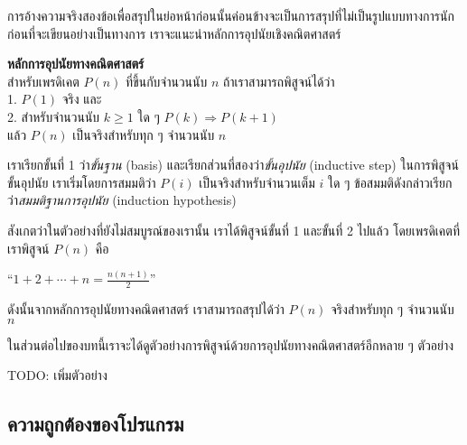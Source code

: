 การ{\wbr}อ้าง{\wbr}ความจริง{\wbr}สอง{\wbr}ข้อ{\wbr}เพื่อ{\wbr}สรุป{\wbr}ใน{\wbr}ย่อหน้า{\wbr}ก่อน{\wbr}นั้น{\wbr}ค่อนข้าง{\wbr}จะ{\wbr}เป็น{\wbr}การ{\wbr}สรุป{\wbr}ที่{\wbr}ไม่{\wbr}เป็น{\wbr}รูปแบบ{\wbr}ทางการ{\wbr}นัก ก่อน{\wbr}ที่{\wbr}จะ{\wbr}เขียน{\wbr}อย่าง{\wbr}เป็นทางการ เรา{\wbr}จะ{\wbr}แนะนำ{\wbr}หลักการ{\wbr}อุปนัย{\wbr}เชิง{\wbr}คณิตศาสตร์{\wbr}

\framed\noindent
{\bf หลักการ{\wbr}อุปนัย{\wbr}ทาง{\wbr}คณิตศาสตร์}\\
สำหรับ{\wbr}เพรดิเคต $P(n)$ ที่{\wbr}ขึ้น{\wbr}กับ{\wbr}จำนวนนับ $n$ ถ้า{\wbr}เรา{\wbr}สามารถ{\wbr}พิสูจน์{\wbr}ได้{\wbr}ว่า\\
1. $P(1)$ จริง และ\\
2. สำหรับ{\wbr}จำนวนนับ $k\geq 1$ ใด ๆ $P(k)\Rightarrow P(k+1)$\\
แล้ว $P(n)$ เป็นจริง{\wbr}สำหรับ{\wbr}ทุก ๆ จำนวนนับ $n$
\endframed

เรา{\wbr}เรียก{\wbr}ขั้น{\wbr}ที่ 1 ว่า{\em ขั้น{\wbr}ฐาน} (basis) และ{\wbr}เรียก{\wbr}ส่วน{\wbr}ที่{\wbr}สอง{\wbr}ว่า{\em ขั้น{\wbr}อุปนัย}
(inductive step) ใน{\wbr}การ{\wbr}พิสูจน์{\wbr}ขั้น{\wbr}อุปนัย เรา{\wbr}เริ่ม{\wbr}โดย{\wbr}การ{\wbr}สมมติ{\wbr}ว่า $ P(i) $
เป็นจริง{\wbr}สำหรับ{\wbr}จำนวนเต็ม $i$ ใด ๆ ข้อสมมติ{\wbr}ดังกล่าว{\wbr}เรียก{\wbr}ว่า{\em สมมติฐาน{\wbr}การ{\wbr}อุปนัย}
(induction hypothesis)

สังเกต{\wbr}ว่า{\wbr}ใน{\wbr}ตัวอย่าง{\wbr}ที่{\wbr}ยัง{\wbr}ไม่{\wbr}สมบูรณ์{\wbr}ของ{\wbr}เรา{\wbr}นั้น เรา{\wbr}ได้{\wbr}พิสูจน์{\wbr}ขั้น{\wbr}ที่ 1 และ{\wbr}ขั้น{\wbr}ที่ 2 ไป{\wbr}แล้ว{\wbr}
โดย{\wbr}เพรดิเคต{\wbr}ที่{\wbr}เรา{\wbr}พิสูจน์ $ P(n) $ คือ{\wbr}

\begin{center}
``$ 1+2+\cdots+n = \frac{n(n+1)}{2} $''
\end{center}

ดังนั้น{\wbr}จาก{\wbr}หลักการ{\wbr}อุปนัย{\wbr}ทาง{\wbr}คณิตศาสตร์ เรา{\wbr}สามารถ{\wbr}สรุป{\wbr}ได้{\wbr}ว่า $ P(n) $ จริง{\wbr}สำหรับ{\wbr}ทุก ๆ
จำนวนนับ $ n $

ใน{\wbr}ส่วนต่อ{\wbr}ไป{\wbr}ของ{\wbr}บท{\wbr}นี้{\wbr}เรา{\wbr}จะ{\wbr}ได้{\wbr}ดู{\wbr}ตัวอย่าง{\wbr}การ{\wbr}พิสูจน์{\wbr}ด้วย{\wbr}การ{\wbr}อุปนัย{\wbr}ทาง{\wbr}คณิตศาสตร์{\wbr}อีก{\wbr}หลาย ๆ
ตัวอย่าง{\wbr}

TODO: เพิ่ม{\wbr}ตัวอย่าง{\wbr}

\subsection{ความ{\wbr}ถูกต้อง{\wbr}ของ{\wbr}โปรแกรม}


